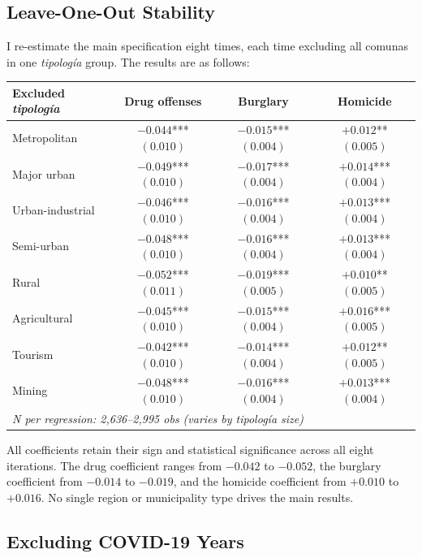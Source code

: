 \documentclass[12pt]{article}
\begin{document}
\subsection{Leave-One-Out Stability}

I re-estimate the main specification eight times, each time excluding all comunas in one \textit{tipolog\'{i}a} group. The results are as follows:

\begin{center}
\begin{tabular}{lccc}
\toprule
Excluded \textit{tipolog\'{i}a} & Drug offenses & Burglary & Homicide \\
\midrule
Metropolitan          & $-0.044$*** $(0.010)$ & $-0.015$*** $(0.004)$ & $+0.012$** $(0.005)$ \\
Major urban           & $-0.049$*** $(0.010)$ & $-0.017$*** $(0.004)$ & $+0.014$*** $(0.004)$ \\
Urban-industrial      & $-0.046$*** $(0.010)$ & $-0.016$*** $(0.004)$ & $+0.013$*** $(0.004)$ \\
Semi-urban            & $-0.048$*** $(0.010)$ & $-0.016$*** $(0.004)$ & $+0.013$*** $(0.004)$ \\
Rural                 & $-0.052$*** $(0.011)$ & $-0.019$*** $(0.005)$ & $+0.010$** $(0.005)$ \\
Agricultural          & $-0.045$*** $(0.010)$ & $-0.015$*** $(0.004)$ & $+0.016$*** $(0.005)$ \\
Tourism               & $-0.042$*** $(0.010)$ & $-0.014$*** $(0.004)$ & $+0.012$** $(0.005)$ \\
Mining                & $-0.048$*** $(0.010)$ & $-0.016$*** $(0.004)$ & $+0.013$*** $(0.004)$ \\
\midrule
\multicolumn{4}{l}{\textit{N per regression: 2,636--2,995 obs (varies by tipolog\'{i}a size)}} \\
\bottomrule
\end{tabular}
\end{center}

All coefficients retain their sign and statistical significance across all eight iterations. The drug coefficient ranges from $-0.042$ to $-0.052$, the burglary coefficient from $-0.014$ to $-0.019$, and the homicide coefficient from $+0.010$ to $+0.016$. No single region or municipality type drives the main results.

\subsection{Excluding COVID-19 Years}
\end{document}
